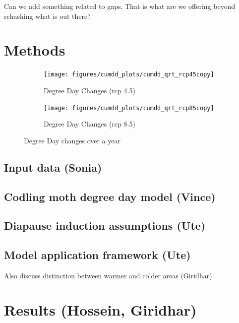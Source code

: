 \documentclass[12pt]{article}
\theoremstyle{plain}
\theoremstyle{definition}
\theoremstyle{definition}
\begin{document}
Can we add something related to gaps. That is what are we offering beyond rehashing what is out there?

\section{Methods}
\begin{figure}[h!]
\begin{subfigure}{.5\textwidth}
  \centering
  \texttt{[image: figures/cumdd\_plots/cumdd\_qrt\_rcp45copy]}
  \label{fig:DDC45}
\caption{Degree Day Changes (rcp 4.5)}
\end{subfigure}
\begin{subfigure}{.5\textwidth}
  \centering
  \texttt{[image: figures/cumdd\_plots/cumdd\_qrt\_rcp85copy]}
  \label{fig:DDC85}
\caption{Degree Day Changes (rcp 8.5)}
\end{subfigure}
\caption{Degree Day changes over a year}
\label{fig:DDC}
\end{figure}

\subsection{Input data  (Sonia)}
\subsection{Codling moth degree day model (Vince)}
\subsection{Diapause induction assumptions (Ute)}
\subsection{Model application framework (Ute)}

Also discuss distinction between warmer and  colder areas (Giridhar)

\section{Results (Hossein, Giridhar)}
\end{document}
